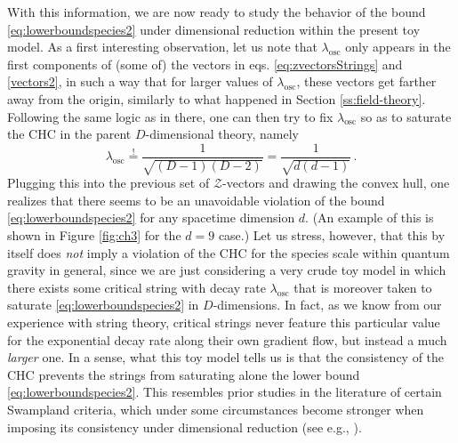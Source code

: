 With this information, we are now ready to study the behavior of the bound \eqref{eq:lowerboundspecies2} under dimensional reduction within the present toy model. As a first interesting observation, let us note that $\lambda_{\text{osc}}$ only appears in the first components of (some of) the vectors in eqs. \eqref{eq:zvectorsStrings} and \eqref{vectors2}, in such a way that for larger values of $\lambda_{\text{osc}}$, these vectors get farther away from the origin, similarly to what happened in Section \ref{ss:field-theory}. Following the same logic as in there, one can then try to fix $\lambda_{\text{osc}}$ so as to saturate the CHC in the parent $D$-dimensional theory, namely
%
\begin{equation}
    \lambda_{\text{osc}} \stackrel{!}{=} \frac{1}{\sqrt{(D-1)(D-2)}} = \frac{1}{\sqrt{d(d-1)}} \, .
\end{equation}
%
Plugging this into the previous set of $\mathcal{Z}$-vectors and drawing the convex hull, one realizes that there seems to be an unavoidable violation of the bound \eqref{eq:lowerboundspecies2} for any spacetime dimension $d$. (An example of this is shown in Figure \ref{fig:ch3} for the $d=9$ case.) Let us stress, however, that this by itself does \emph{not} imply a violation of the CHC for the species scale within quantum gravity in general, since we are just considering a very crude toy model in which there exists some critical string with decay rate $\lambda_{\text{osc}}$ that is moreover taken to saturate \eqref{eq:lowerboundspecies2} in $D$-dimensions. In fact, as we know from our experience with string theory, critical strings never feature this particular value for the exponential decay rate along their own gradient flow, but instead a much \emph{larger} one. In a sense, what this toy model tells us is that the consistency of the CHC prevents the strings from saturating alone the lower bound \eqref{eq:lowerboundspecies2}. This resembles prior studies in the literature of certain Swampland criteria, which under some circumstances become stronger when imposing its consistency under dimensional reduction (see e.g., \cite{Heidenreich:2015nta}).


